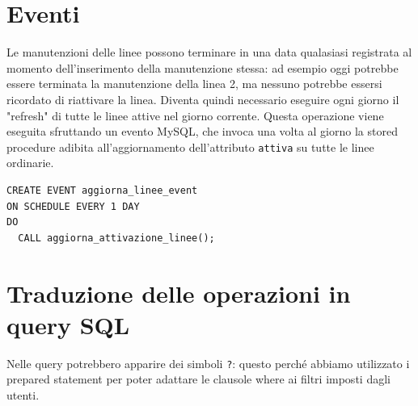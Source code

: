 \documentclass[12pt,a4paper]{report}
\begin{document}
\section{Eventi}
Le manutenzioni delle linee possono terminare in una data qualasiasi registrata al momento dell'inserimento della manutenzione stessa: ad esempio oggi potrebbe essere terminata la manutenzione della linea 2, ma nessuno potrebbe essersi ricordato di riattivare la linea. Diventa quindi necessario eseguire ogni giorno il "refresh" di tutte le linee attive nel giorno corrente. Questa operazione viene eseguita sfruttando un evento MySQL, che invoca una volta al giorno la stored procedure adibita all'aggiornamento dell'attributo \texttt{attiva} su tutte le linee ordinarie. \\
\begin{lstlisting}[style=sqlstyle]
CREATE EVENT aggiorna_linee_event
ON SCHEDULE EVERY 1 DAY
DO
  CALL aggiorna_attivazione_linee();
\end{lstlisting}

\section{Traduzione delle operazioni in query SQL}
Nelle query potrebbero apparire dei simboli \texttt{?}: questo perché abbiamo utilizzato i prepared statement per poter adattare le clausole where ai filtri imposti dagli utenti.
\end{document}
